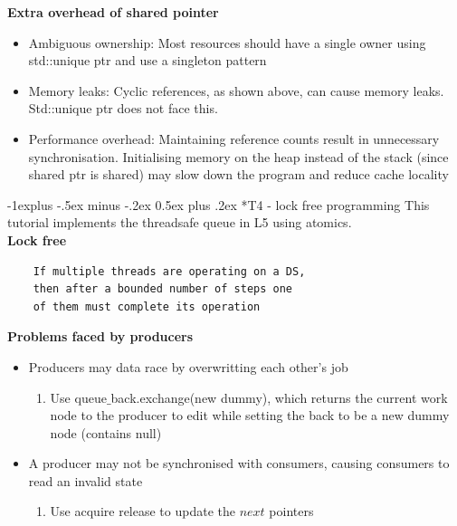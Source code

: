 \documentclass[10pt, landscape]{article}
\makeatletter
\renewcommand{\subsection}{\@startsection{subsection}{2}{0mm}%
                                {-1explus -.5ex minus -.2ex}%
                                {0.5ex plus .2ex}%
                                {\normalfont\normalsize\bfseries}}
\makeatother
\begin{document}
\begin{multicols}{4}
\textbf{Extra overhead of shared pointer} \\
\begin{itemize}
    \item Ambiguous ownership: Most resources should have a single owner using std::unique ptr and use a singleton pattern
    \item Memory leaks: Cyclic references, as shown above, can cause memory leaks. Std::unique ptr does not face this. 
    \item Performance overhead: Maintaining reference counts result in unnecessary synchronisation. Initialising memory on the heap instead of the stack (since shared ptr is shared) may slow down the program and reduce cache locality
\end{itemize}

\subsection*{T4 - lock free programming} 
This tutorial implements the threadsafe queue in L5 using atomics.\\

\textbf{Lock free} \\
\begin{verbatim}
    If multiple threads are operating on a DS, 
    then after a bounded number of steps one 
    of them must complete its operation
\end{verbatim}

\textbf{Problems faced by producers} \\
\begin{itemize}
    \item  Producers may data race by overwritting each other's job
    \begin{enumerate}
        \item Use queue$\_$back.exchange(new dummy), which returns the current work node to the producer to edit while setting the back to be a new dummy node (contains null)
    \end{enumerate}
    \item A producer may not be synchronised with consumers, causing consumers to read an invalid state
    \begin{enumerate}
        \item Use acquire release to update the $next$ pointers 
    \end{enumerate}
\end{itemize}


\end{multicols}
\end{document}
